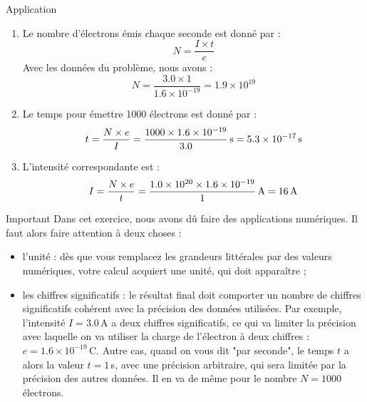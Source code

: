 \documentclass[10pt,a5paper,notitlepage]{book}
\begin{document}
\begin{NCexem}{Application}
	\begin{enumerate}
		\item Le nombre d'électrons émis chaque seconde est donné par :
		\begin{equation}
			N = \dfrac{I \times t}{e}
		\end{equation}
		Avec les données du problème, nous avons :
		\begin{equation}
			N = \dfrac{3.0 \times 1}{1.6\times 10^{-19}} = 1.9\times 10^{19}
		\end{equation}
		\item Le temps pour émettre 1000 électrons est donné par :
		\begin{equation}
			t = \dfrac{N\times e}{I} = \dfrac{1000 \times 1.6\times 10^{-19}}{3.0}\,{\rm s} = 5.3\times 10^{-17}\,{\rm s}
		\end{equation}
		\item L'intensité correspondante est :
		\begin{equation}
			I = \dfrac{N\times e}{t} = \dfrac{1.0\times 10^{20} \times 1.6\times 10^{-19}}{1}\,{\rm A} = 16\,{\rm A}
		\end{equation}
	\end{enumerate}
\end{NCexem}

\begin{impo}{Important}
	Dans cet exercice, nous avons dû faire des applications numériques. Il faut alors faire attention à deux choses :
	\begin{itemize}
		\item l'unité : dès que vous remplacez les grandeurs littérales par des valeurs numériques, votre calcul acquiert une unité, qui doit apparaître ;
		\item les chiffres significatifs : le résultat final doit comporter un nombre de chiffres significatifs cohérent avec la précision des données utilisées. Par exemple, l'intensité $I = 3.0\,$A a deux chiffres significatifs, ce qui va limiter la précision avec laquelle on va utiliser la charge de l'électron à deux chiffres : $e = 1.6\times 10^{-19}\,$C. Autre cas, quand on vous dit "par seconde", le temps $t$ a alors la valeur $t = 1\,$s, avec une précision arbitraire, qui sera limitée par la précision des autres données. Il en va de même pour le nombre $N = 1000$ électrons.
	\end{itemize}
\end{impo}

\newpage
\end{document}
